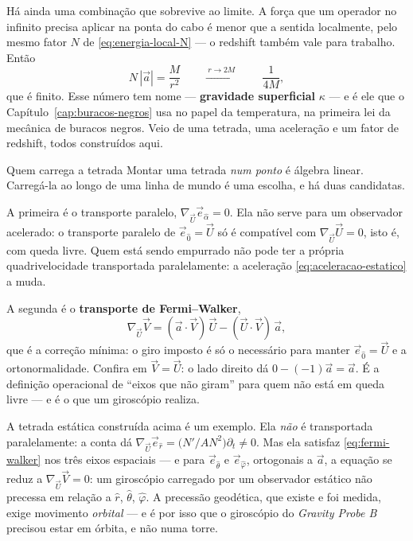 \documentclass[12pt,a4paper,oneside]{book}
\theoremstyle{rgplain}
\theoremstyle{rgremark}
\begin{document}
Há ainda uma combinação que sobrevive ao limite. A força que um operador no
infinito precisa aplicar na ponta do cabo é menor que a sentida localmente,
pelo mesmo fator $N$ de \eqref{eq:energia-local-N} --- o redshift também vale
para trabalho. Então
\begin{equation}
  N\,|\vec a|=\frac{M}{r^2}
  \qquad\xrightarrow{\ r\to2M\ }\qquad
  \frac{1}{4M} ,
  \label{eq:gravidade-superficial}
\end{equation}
que é finito. Esse número tem nome --- \textbf{gravidade superficial}
$\kappa$ --- e é ele que o Capítulo~\ref{cap:buracos-negros} usa no papel da
temperatura, na primeira lei da mecânica de buracos negros. Veio de uma
tetrada, uma aceleração e um fator de redshift, todos
construídos aqui.

\begin{interludio}{Quem carrega a tetrada}
Montar uma tetrada \emph{num ponto} é álgebra linear. Carregá-la ao longo de
uma linha de mundo é uma escolha, e há duas candidatas.

A primeira é o transporte paralelo, $\nabla_{\vec U}\vec e_{\hat\alpha}=0$. Ela
não serve para um observador acelerado: o
transporte paralelo de $\vec e_{\hat 0}=\vec U$ só é compatível com
$\nabla_{\vec U}\vec U=0$, isto é, com queda livre. Quem está sendo empurrado
não pode ter a própria quadrivelocidade transportada paralelamente: a
aceleração \eqref{eq:aceleracao-estatico} a muda.

A segunda é o \textbf{transporte de Fermi--Walker},
\begin{equation}
  \nabla_{\vec U}\vec V
  =(\vec a\cdot\vec V)\,\vec U-(\vec U\cdot\vec V)\,\vec a ,
  \label{eq:fermi-walker}
\end{equation}
que é a correção mínima: o giro imposto é só o necessário para
manter $\vec e_{\hat 0}=\vec U$ e a ortonormalidade. Confira em
$\vec V=\vec U$: o lado direito dá $0-(-1)\vec a=\vec a$. É a
definição operacional de ``eixos que não giram'' para quem não está em queda
livre --- e é o que um giroscópio realiza.

A tetrada estática construída acima é um exemplo. Ela \emph{não} é transportada
paralelamente: a conta dá
$\nabla_{\vec U}\vec e_{\hat r}=\bigl(N'/AN^2\bigr)\partial_t\neq0$. Mas ela
satisfaz \eqref{eq:fermi-walker} nos três eixos espaciais --- e
para $\vec e_{\hat\theta}$ e $\vec e_{\hat\varphi}$, ortogonais a $\vec a$, a
equação se reduz a $\nabla_{\vec U}\vec V=0$: um giroscópio carregado por um
observador estático não precessa em relação a
$\hat r$, $\hat\theta$, $\hat\varphi$. A precessão geodética, que existe e foi
medida, exige movimento \emph{orbital} --- e é por isso que o giroscópio do
\emph{Gravity Probe B} precisou estar em órbita, e não numa torre.
\end{interludio}
\end{document}
